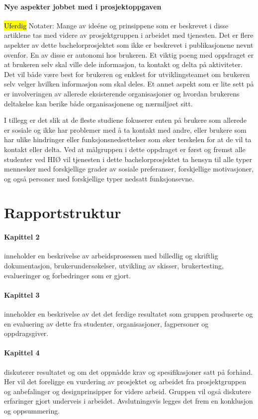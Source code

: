 \paragraph{Nye aspekter jobbet med i prosjektoppgaven}
\hl{Uferdig}
Notater:
Mange av ideéne og prinsippene som er beskrevet i disse artiklene tas med videre av prosjektgruppen i arbeidet med tjenesten. Det er flere aspekter av dette bachelorprosjektet som ikke er beskrevet i publikasjonene nevnt ovenfor. En av disse er autonomi hos brukeren. Et viktig poeng med oppdraget er at brukeren selv skal ville dele informasjon, ta kontakt og delta på aktiviteter. Det vil både være best for brukeren og enklest for utviklingsteamet om brukeren selv velger hvilken informasjon som skal deles. Et annet aspekt som er lite sett på er involveringen av allerede eksisterende organisasjoner og hvordan brukerens deltakelse kan berike både organisasjonene og nærmiljøet sitt. 

I tillegg er det slik at de fleste studiene fokuserer enten på brukere som allerede er sosiale og ikke har problemer med å ta kontakt med andre, eller brukere som har ulike hindringer eller funksjonsnedsettelser som øker terskelen for at de vil ta kontakt eller delta. Ved at målgruppen i dette oppdraget er først og fremst alle studenter ved HIØ vil tjenesten i dette bachelorprosjektet ta hensyn til alle typer mennesker med forskjellige grader av sosiale preferanser, forskjellige motivasjoner, og også personer med forskjellige typer nedsatt funksjonsevne.

\section{Rapportstruktur}
\paragraph{Kapittel 2} inneholder en beskrivelse av arbeidsprosessen med billedlig og skriftlig dokumentasjon, brukerundersøkelser, utvikling av skisser, brukertesting, evalueringer og forbedringer som er gjort.

\paragraph{Kapittel 3}
inneholder en beskrivelse av det det ferdige resultatet som gruppen produserte og en evaluering av dette fra studenter, organisasjoner, fagpersoner og oppdragsgiver.

\paragraph{Kapittel 4}
diskuterer resultatet og om det oppnådde krav og spesifikasjoner satt på forhånd. Her vil det foreligge en vurdering av prosjektet og arbeidet fra prosjektgruppen og anbefalinger og designprinsipper for videre arbeid. Gruppen vil også diskutere erfaringer gjort underveis i arbeidet. Avslutningsvis legges det frem en konklusjon og oppsummering.

